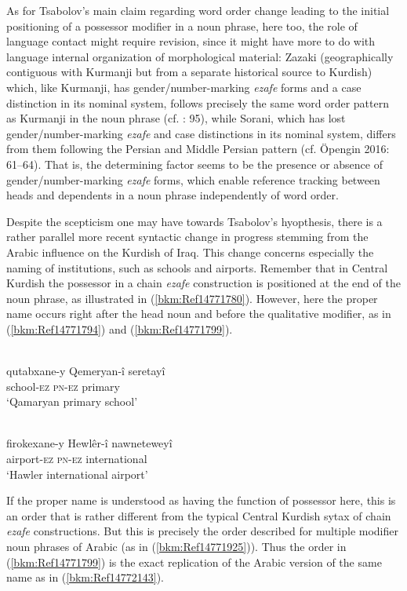 \documentclass[output=paper]{langsci/langscibook}
\begin{document}
As for Tsabolov’s main claim regarding word order change leading to the initial positioning of a possessor modifier in a noun phrase, here too, the role of language contact might require revision, since it might have more to do with language internal organization of morphological material: Zazaki (geographically contiguous with Kurmanji but from a separate historical source to Kurdish) which, like Kurmanji, has gender/number-marking \textit{ezafe} forms and a case distinction in its nominal system, follows precisely the same word order pattern as Kurmanji in the noun phrase (cf. \citealt{Todd2002}: 95), while Sorani, which has lost gender/number-marking \textit{ezafe} and case distinctions in its nominal system, differs from them following the Persian and Middle Persian pattern (cf. Öpengin 2016: 61–64). That is, the determining factor seems to be the presence or absence of gender/number-marking \textit{ezafe} forms, which enable reference tracking between heads and dependents in a noun phrase independently of word order.   

Despite the scepticism one may have towards Tsabolov’s hyopthesis, there is a rather parallel more recent syntactic change in progress stemming from the Arabic influence on the Kurdish of Iraq. This change concerns especially the naming of institutions, such as schools and airports. Remember that in Central Kurdish the possessor in a chain \textit{ezafe} construction is positioned at the end of the noun phrase, as illustrated in (\ref{bkm:Ref14771780}). However, here the proper name occurs right after the head noun and before the qualitative modifier, as in (\ref{bkm:Ref14771794}) and (\ref{bkm:Ref14771799}). 

\ea\label{ex:opengin:}
\\
\gll qutabxane-y Qemeryan-î seretayî\\
     school-\textsc{ez} \textsc{pn-ez} primary\\
\glt ‘Qamaryan primary school’
\z

\ea\label{ex:opengin:}
\\
\gll firokexane-y Hewlêr-î nawneteweyî\\
     airport-\textsc{ez} \textsc{pn-ez} international\\
\glt ‘Hawler international airport’
\z

If the proper name is understood as having the function of possessor here, this is an order that is rather different from the typical Central Kurdish sytax of chain \textit{ezafe} constructions. But this is precisely the order described for multiple modifier noun phrases of Arabic (as in (\ref{bkm:Ref14771925})). Thus the order in (\ref{bkm:Ref14771799}) is the exact replication of the Arabic version of the same name as in (\ref{bkm:Ref14772143}).
\end{document}
